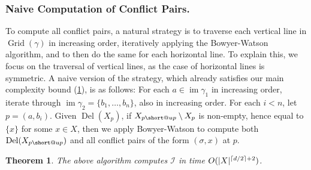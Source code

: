 \documentclass[11pt]{amsart}
\makeatletter
\DeclarePairedDelimiter\ceil{\lceil}{\rceil}
\DeclarePairedDelimiter\abs{\lvert}{\rvert}
\DeclareMathOperator{\DelT}{Del}
\DeclareMathOperator{\Grid}{\mathrm{Grid}}
\DeclareMathOperator{\im}{im}
\newcommand{\Incr}[0]{\mathcal{I}}
\DeclareRobustCommand{\subup}{%
  \mathrel{\mathpalette\short@up\relax}%
}
\newcommand{\short@up}[2]{%
  \mkern2mu
  \clipbox{0 {.35\height} 0 0}{$\m@th#1\vphantom{+}{\uparrow}$}%
}
\renewcommand{\subparagraph}[1]{\subsubsection*{\textbf{\textup{#1}}}}
\theoremstyle{plain}
\newtheorem{theorem}{Theorem}[section]
\theoremstyle{definition}
\theoremstyle{remark}
\makeatother
\begin{document}
%
\subparagraph{Naive Computation of Conflict Pairs.}
To compute all conflict pairs, a natural strategy is to traverse each vertical line in $\Grid(\gamma)$ in increasing order, iteratively applying the Bowyer-Watson algorithm, and to then do the same for each horizontal line.  To explain this, we focus on the traversal of vertical lines, as the case of horizontal lines is symmetric.  A naive version of the strategy, which already satisfies our main complexity bound (\cref{Thm:Time_Bound}), is as follows: For each $a\in \im \gamma_1$ in increasing order, iterate through $\im \gamma_2=\{b_1,\ldots,b_n\}$, also in increasing order.  For each $i < n$, let $p=(a,b_i)$.   Given $\DelT(X_{p})$,  if $X_{p{\subup}}\setminus X_{p}$ is non-empty, hence equal to $\{x\}$ for some $x\in X$, then we apply Bowyer-Watson to compute both $\DelT(X_{p{\subup}})$ and all conflict pairs of the form $(\sigma,x)$ at $p$.  
%

\begin{theorem}\label{Thm:Time_Bound}
The above algorithm computes $\Incr$ in time $O(\abs{X}^{\ceil{d/2}+2})$.
\end{theorem}
\end{document}
